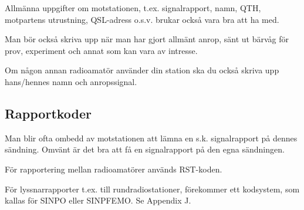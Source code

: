 Allmänna uppgifter om motstationen, t.ex. signalrapport, namn, QTH,
motpartens utrustning, QSL-adress o.s.v. brukar också vara bra att ha
med.

Man bör också skriva upp när man har gjort allmänt anrop, sänt ut
bärvåg för prov, experiment och annat som kan vara av intresse.

Om någon annan radioamatör använder din station ska du också skriva
upp hans/hennes namn och anropssignal.

\subsection{Rapportkoder}

Man blir ofta ombedd av motstationen att lämna en s.k. signalrapport
på dennes sändning. Omvänt är det bra att få en signalrapport på den
egna sändningen.

För rapportering mellan radioamatörer används RST-koden.

För lyssnarrapporter t.ex. till rundradiostationer, förekommer ett
kodsystem, som kallas för SINPO eller SINPFEMO. Se Appendix J.
